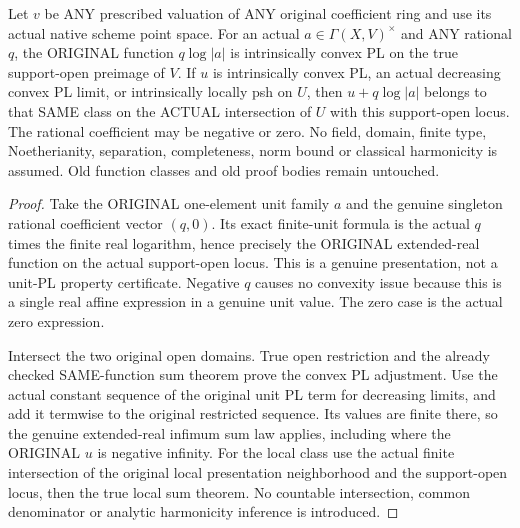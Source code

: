 \begin{theorem}
\label{scheme:actual-native-rational-unit-log-adjustments}
\leanok
{}
Let $v$ be ANY prescribed valuation of ANY original coefficient ring and use
its actual native scheme point space. For an actual $a\in\Gamma(X,V)^\times$
and ANY rational $q$, the ORIGINAL function $q\log|a|$ is intrinsically convex
PL on the true support-open preimage of $V$. If $u$ is intrinsically convex
PL, an actual decreasing convex PL limit, or intrinsically locally psh on
$U$, then $u+q\log|a|$ belongs to that SAME class on the ACTUAL intersection
of $U$ with this support-open locus. The rational coefficient may be negative
or zero. No field, domain, finite type, Noetherianity, separation, completeness,
norm bound or classical harmonicity is assumed. Old function classes and
old proof bodies remain untouched.
\end{theorem}
\begin{proof}
Take the ORIGINAL one-element unit family $a$ and the genuine singleton
rational coefficient vector $(q,0)$. Its exact finite-unit formula is the
actual $q$ times the finite real logarithm, hence precisely the ORIGINAL
extended-real function on the actual support-open locus. This is a genuine
presentation, not a unit-PL property certificate. Negative $q$ causes no
convexity issue because this is a single real affine expression in a genuine
unit value. The zero case is the actual zero expression.

Intersect the two original open domains. True open restriction and the
already checked SAME-function sum theorem prove the convex PL adjustment.
Use the actual constant sequence of the original unit PL term for decreasing
limits, and add it termwise to the original restricted sequence. Its values
are finite there, so the genuine extended-real infimum sum law applies,
including where the ORIGINAL $u$ is negative infinity. For the local class
use the actual finite intersection of the original local presentation
neighborhood and the support-open locus, then the true local sum theorem.
No countable intersection, common denominator or analytic harmonicity inference
is introduced.
\end{proof}
